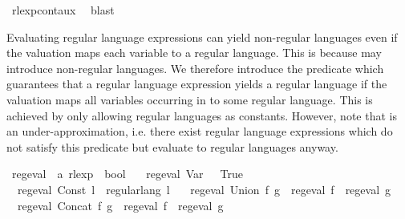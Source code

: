\begin{isabellebody}
\ rlexp{\isacharunderscore}{\kern0pt}cont{\isacharunderscore}{\kern0pt}aux{}\ \isamarkupfalse%
\ blast\isanewline
{}\isamarkupfalse%
%
\endisatagproof
{\isafoldproof}%
%
\isadelimproof
%
\endisadelimproof
%
\isadelimdocument
%
\endisadelimdocument
%
\isatagdocument
%
\isamarkuptrue%
%
\endisatagdocument
{\isafolddocument}%
%
\isadelimdocument
%
\endisadelimdocument
%
\begin{isamarkuptext}%
Evaluating regular language expressions can yield non-regular languages even if
the valuation maps each variable to a regular language. This is because  may introduce
non-regular languages.
We therefore introduce the predicate  which guarantees that a regular language expression
 yields a regular language if the valuation maps all variables occurring in  to some regular
language. This is achieved by only allowing regular languages as constants.
However, note that  is an under-approximation, i.e. there exist regular language
expressions which do not satisfy this predicate but evaluate to regular languages anyway.%
\end{isamarkuptext}\isamarkuptrue%
\isamarkupfalse%
\ reg{\isacharunderscore}{\kern0pt}eval\ {\isacharcolon}{\kern0pt}{\isacharcolon}{\kern0pt}\ {\isachardoublequoteopen}{\isacharprime}{\kern0pt}a\ rlexp\ {\isasymRightarrow}\ bool{\isachardoublequoteclose}\ \isanewline
\ \ {\isachardoublequoteopen}reg{\isacharunderscore}{\kern0pt}eval\ {\isacharparenleft}{\kern0pt}Var\ {\isacharunderscore}{\kern0pt}{\isacharparenright}{\kern0pt}\ {\isasymlongleftrightarrow}\ True{\isachardoublequoteclose}\ {\isacharbar}{\kern0pt}\isanewline
\ \ {\isachardoublequoteopen}reg{\isacharunderscore}{\kern0pt}eval\ {\isacharparenleft}{\kern0pt}Const\ l{\isacharparenright}{\kern0pt}\ {\isasymlongleftrightarrow}\ regular{\isacharunderscore}{\kern0pt}lang\ l{\isachardoublequoteclose}\ {\isacharbar}{\kern0pt}\isanewline
\ \ {\isachardoublequoteopen}reg{\isacharunderscore}{\kern0pt}eval\ {\isacharparenleft}{\kern0pt}Union\ f\ g{\isacharparenright}{\kern0pt}\ {\isasymlongleftrightarrow}\ reg{\isacharunderscore}{\kern0pt}eval\ f\ {\isasymand}\ reg{\isacharunderscore}{\kern0pt}eval\ g{\isachardoublequoteclose}\ {\isacharbar}{\kern0pt}\isanewline
\ \ {\isachardoublequoteopen}reg{\isacharunderscore}{\kern0pt}eval\ {\isacharparenleft}{\kern0pt}Concat\ f\ g{\isacharparenright}{\kern0pt}\ {\isasymlongleftrightarrow}\ reg{\isacharunderscore}{\kern0pt}eval\ f\ {\isasymand}\ reg{\isacharunderscore}{\kern0pt}eval\ g{\isachardoublequoteclose}\ {\isacharbar}{\kern0pt}\isanewline

\end{isabellebody}
